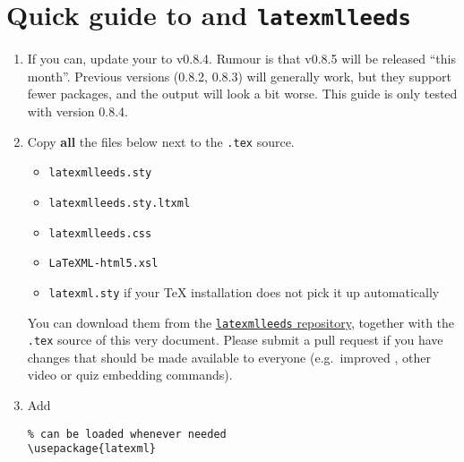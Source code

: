 \documentclass[a4paper]{article}
\theoremstyle{definition}
\begin{document}
\section{Quick guide to \texorpdfstring{\LaTeXML{}}{LaTeXML} and \texttt{latexmlleeds}}
\begin{enumerate}
  \item If you can, update your \LaTeXML{} to v0.8.4. Rumour is that v0.8.5 will be released ``this month''. Previous versions (0.8.2, 0.8.3) will generally work, but they support fewer packages, and the output will look a bit worse. This guide is only tested with version 0.8.4.
  \item Copy \textbf{all} the files below next to the \verb|.tex| source.
  \begin{itemize}
    \item \verb|latexmlleeds.sty|
    \item \verb|latexmlleeds.sty.ltxml|
    \item \verb|latexmlleeds.css|
    \item \verb|LaTeXML-html5.xsl|
    \item \verb|latexml.sty| if your \TeX{} installation does not pick it up automatically
  \end{itemize}
  You can download them from the \href{https://dev.azure.com/pmtvlm-leeds-ac-uk/public/_git/latexmlleeds}{\texttt{latexmlleeds} repository}, together with the \verb|.tex| source of this very document. Please submit a pull request if you have changes that should be made available to everyone (e.g.\ improved \CSS{}, other video or quiz embedding commands).
  \item Add
  \begin{lstlisting}[style=latexml]
% for \iflatexml and other goodies
% can be loaded whenever needed
\usepackage{latexml}


\end{lstlisting}
\end{enumerate}
\end{document}
